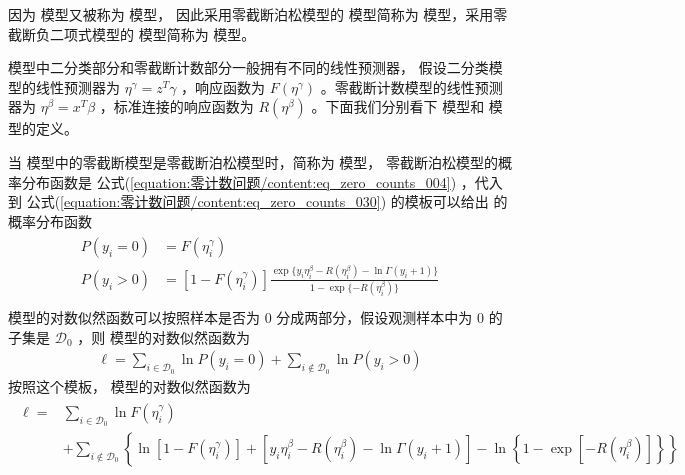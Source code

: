 \documentclass[letterpaper,10pt,english]{sphinxmanual}
\begin{document}
因为  模型又被称为  模型，
因此采用零截断泊松模型的  模型简称为 
模型，采用零截断负二项式模型的  模型简称为 
模型。

 模型中二分类部分和零截断计数部分一般拥有不同的线性预测器，
假设二分类模型的线性预测器为 \(\eta^{\gamma}=z^T \gamma\)
，响应函数为 \(F(\eta^{\gamma})\)
。零截断计数模型的线性预测器为 \(\eta^{\beta}=x^T \beta\)
，标准连接的响应函数为 \(R(\eta^{\beta})\)
。下面我们分别看下  模型和
 模型的定义。


当  模型中的零截断模型是零截断泊松模型时，简称为  模型，
零截断泊松模型的概率分布函数是 公式(\ref{equation:零计数问题/content:eq_zero_counts_004})
，代入到 公式(\ref{equation:零计数问题/content:eq_zero_counts_030}) 的模板可以给出  的概率分布函数
\begin{align}\label{equation:零计数问题/content:eq_zero_counts_031}\!\begin{aligned}
P(y_i=0) &= F(\eta^{\gamma}_i)\\
P(y_i>0) &= \left [ 1-F(\eta^{\gamma}_i) \right ]
\frac{\exp \{ y_i \eta^{\beta}_i  -R(\eta_i^{\beta}) - \ln \Gamma(y_i+1)   \}}
{1-\exp \{  -R(\eta^{\beta}_i)   \}}\\
\end{aligned}\end{align}
 模型的对数似然函数可以按照样本是否为 \(0\)
分成两部分，假设观测样本中为 \(0\) 的子集是  \(\mathcal{D}_0\)
，则  模型的对数似然函数为
\begin{equation}\label{equation:零计数问题/content:eq_zero_counts_032}
\begin{split}\ell = \sum_{i \in \mathcal{D}_0 } \ln P(y_i=0)
        + \sum_{i \notin \mathcal{D}_0 }  \ln P(y_i>0)\end{split}
\end{equation}
按照这个模板， 模型的对数似然函数为
\begin{align}\label{equation:零计数问题/content:eq_zero_counts_033}\!\begin{aligned}
\ell = &\sum_{i \in \mathcal{D}_0 } \ln F(\eta^{\gamma}_i)\\
&+\sum_{i \notin \mathcal{D}_0 }
\left \{
\ln \left [ 1-F(\eta^{\gamma}_i) \right ] +
\left [ y_i \eta^{\beta}_i  -R(\eta_i^{\beta}) - \ln \Gamma(y_i+1)   \right ] -
\ln  \left \{ 1-\exp [  -R(\eta^{\beta}_i) ] \right \}
\right \}\\
\end{aligned}\end{align}
\end{document}
